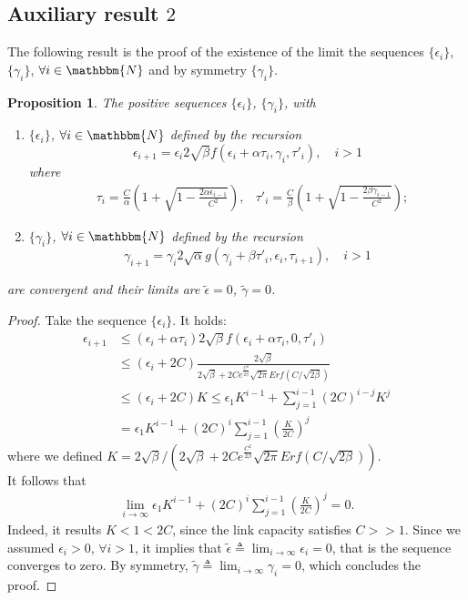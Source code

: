 \documentclass[a4paper,oneside, 11pt]{article}
\newcommand{\N}[1]{\mathbbm{N}}
\newtheorem{prop}[theorem]{Proposition}
\begin{document}
\begin{appendix}
\section{Auxiliary result $2$}\label{app:2}
The following result is the proof of the existence of the limit
the sequences $\{\epsilon_i\}$, $\{\gamma_i\}$, $\forall i\in \N,$ and by symmetry $\{\gamma_i\}$.\begin{prop}The positive sequences  $\{\epsilon_i\}$,  $\{\gamma_i\}$, with
\begin{enumerate}
 \item $\{\epsilon_i\}$, $\forall i  \in \N,$ defined by the recursion
$$\epsilon_{i+1}=\epsilon_{i}2\sqrt{\beta}f( \epsilon_{i}+\alpha\tau_{i},\gamma_{i},\tau'_i), \quad i>1$$where
\begin{align*}
&\tau_i=\frac{C}{\alpha}\left(1+\sqrt{1-\frac{2\alpha\epsilon_{i-1}}{C^2}}\right), &\tau'_i=\frac{C}{\beta}\left(1+\sqrt{1-\frac{2\beta\gamma_{i-1}}{C^2}}\right);\nonumber
\end{align*}
\item $\{\gamma_i\}$, $\forall i  \in \N,$ defined by the recursion
$$\gamma_{i+1}=\gamma_{i}2\sqrt{\alpha}g(\gamma_{i}+\beta\tau'_i,\epsilon_{i},\tau_{i+1}), \quad  i>1$$
\end{enumerate}
are convergent and their limits are $\widetilde\epsilon=0$, $\widetilde\gamma=0$.
\end{prop}
\begin{proof}
Take the sequence $\{\epsilon_i\}$. It holds:
\begin{align*}
\epsilon_{i+1} &\le \left(\epsilon_{i}+\alpha\tau_i\right)2\sqrt{\beta} f(\epsilon_{i}+\alpha\tau_i,0,\tau'_i) \nonumber \\
               &\le \left(\epsilon_{i}+2C\right)\frac{2\sqrt{\beta}}{2\sqrt{\beta}+2Ce^{\frac{C^2}{2\beta}}\sqrt{2\pi} Erf(C/\sqrt{2\beta})}
\nonumber \\
           &\le\left(\epsilon_{i}+2C\right)K
\le \epsilon_1 K^{i-1}+\sum_{j=1}^{i-1} (2C)^{i-j}K^j \nonumber \\
&= \epsilon_1 K^{i-1}+(2C)^i\sum_{j=1}^{i-1}\left(\frac{K}{2C}\right)^j
\end{align*}
where we defined  $K=2\sqrt{\beta}/\left(2\sqrt{\beta}+2Ce^{\frac{C^2}{2\beta}}\sqrt{2\pi} Erf(C/\sqrt{2\beta})\right)$.\\
It follows that \begin{align}\label{eq:lim}
\lim_{i\rightarrow \infty} \epsilon_1 K^{i-1}+(2C)^i\sum_{j=1}^{i-1}\left(\frac{K}{2C}\right)^j =0.
\end{align}Indeed, it results $K<1<2C$, since the link capacity satisfies $C>>1$.
Since we assumed $\epsilon_i>0$, $\forall i>1$, it implies that $\widetilde \epsilon\triangleq \lim_{i\rightarrow \infty} \epsilon_i=0$, that is the sequence converges to zero.
By symmetry, $\widetilde \gamma \triangleq \lim_{i\rightarrow \infty} \gamma_i=0$, which concludes the proof.
\end{proof}

\end{appendix}
\end{document}
